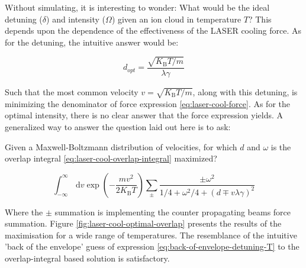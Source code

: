 Without simulating, it is interesting to wonder: What would be the ideal detuning ($\delta$) and intensity ($\Omega$) given an ion cloud in temperature $T$? This depends upon the dependence of the effectiveness of the LASER cooling force. As for the detuning, the intuitive answer would be:

\begin{equation}
	d_{opt} = \frac{\sqrt{K_\text{B} T/m}}{\lambda\gamma}
	\label{eq:back-of-envelope-detuning-T}
\end{equation}

Such that the most common velocity $v = \sqrt{K_\text{B} T/m}$, along with this detuning, is minimizing the denominator of force expression \ref{eq:laser-cool-force}. As for the optimal intensity, there is no clear answer that the force expression yields. A generalized way to answer the question laid out here is to ask:

Given a Maxwell-Boltzmann distribution of velocities, for which $d$ and $\omega$ is the overlap integral \ref{eq:laser-cool-overlap-integral} maximized?

\begin{equation}
	\int_{-\infty}^\infty\,\mathrm{d}v\exp\left(-\frac{m v^2}{2 K_\text{B} T}\right) \sum_\pm \frac{\pm\omega^2}{1/4 + \omega^2/4 + (d \mp v\lambda\gamma)^2}
	\label{eq:laser-cool-overlap-integral}
\end{equation}

Where the $\pm$ summation is implementing the counter propagating beams force summation. Figure \ref{fig:laser-cool-optimal-overlap} presents the results of the maximisation for a wide range of temperatures. The resemblance of the intuitive 'back of the envelope' guess of expression \ref{eq:back-of-envelope-detuning-T} to the overlap-integral based solution is satisfactory.

